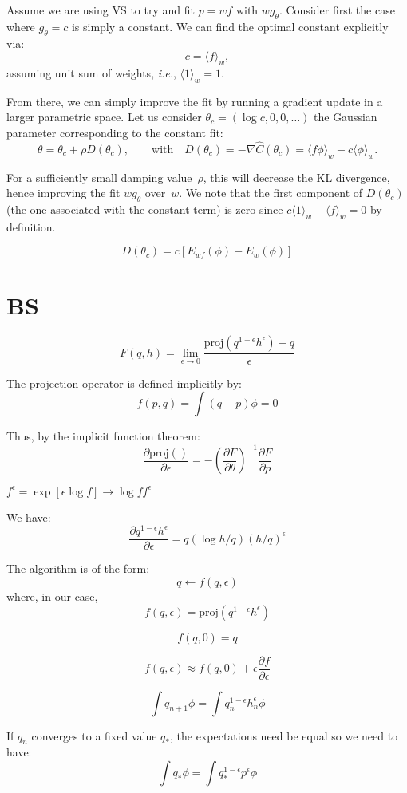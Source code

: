 \documentclass{article}
\begin{document}
Assume we are using VS to try and fit $p=wf$ with $w g_\theta$. Consider first the case where $g_\theta = c$ is simply a constant. We can find the optimal constant explicitly via:
$$
c  = \langle f \rangle_w,
$$
assuming unit sum of weights, {\em i.e.}, $\langle 1 \rangle_w=1$.

From there, we can simply improve the fit by running a gradient update in a larger parametric space. Let us consider $\theta_c = (\log c, 0, 0, \ldots)$ the Gaussian parameter corresponding to the constant fit: 
$$
\theta = \theta_c + \rho D(\theta_c),
\qquad \text{with} \quad
D(\theta_c) = - \nabla \hat{C}(\theta_c)
= \langle f\phi \rangle_w - c \langle \phi \rangle_w.
$$

For a sufficiently small damping value~$\rho$, this will decrease the KL divergence, hence improving the fit $wg_\theta$ over~$w$. We note that the first component of $D(\theta_c)$ (the one associated with the constant term) is zero since $c\langle 1 \rangle_w - \langle f \rangle_w = 0$ by definition. 

$$
D(\theta_c) = c [E_{wf}(\phi) - E_{w}(\phi)]
$$


\section{BS}

$$
F(q,h) = \lim_{\epsilon\to 0} 
\frac{\text{proj}(q^{1-\epsilon}h^\epsilon)-q}{\epsilon}
$$

The projection operator is defined implicitly by:
$$
f(p,q) = \int (q-p) \phi = 0
$$

Thus, by the implicit function theorem:
$$
\frac{\partial \text{proj}()}{\partial \epsilon}
= - \left(\frac{\partial F}{\partial \theta}\right)^{-1} \frac{\partial F}{\partial p}
$$

$
f^{\epsilon}= \exp [\epsilon\log f]
\to \log f f^{\epsilon}$

We have:
$$
\frac{\partial q^{1-\epsilon}h^\epsilon}{\partial \epsilon}
=
q (\log h/q) (h/q)^\epsilon
$$


The algorithm is of the form:
$$
q \leftarrow f(q, \epsilon)
$$
where, in our case,
$$
f(q,\epsilon) = \text{proj}(q^{1-\epsilon} h^\epsilon)
$$

$$
f(q,0) = q
$$

$$
f(q,\epsilon) \approx f(q,0) + \epsilon \frac{\partial f}{\partial \epsilon}
$$

$$
\int q_{n+1} \phi = \int q_n^{1-\epsilon} h_n^\epsilon \phi
$$

If $q_n$ converges to a fixed value $q_*$, the expectations need be equal so we need to have: 
$$
\int q_*\phi = \int q_*^{1-\epsilon}p^\epsilon \phi
$$
\end{document}
